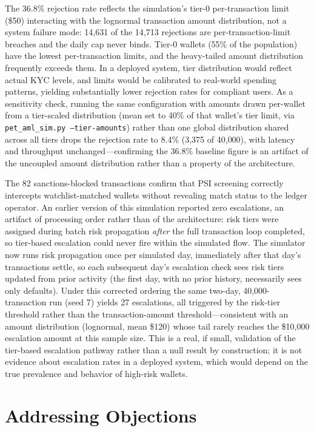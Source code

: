 \documentclass[11pt]{article}
\begin{document}
The 36.8\% rejection rate reflects the simulation's tier-0 per-transaction limit (\$50) interacting with the lognormal transaction amount distribution, not a system failure mode: 14{,}631 of the 14{,}713 rejections are per-transaction-limit breaches and the daily cap never binds. Tier-0 wallets (55\% of the population) have the lowest per-transaction limits, and the heavy-tailed amount distribution frequently exceeds them. In a deployed system, tier distribution would reflect actual KYC levels, and limits would be calibrated to real-world spending patterns, yielding substantially lower rejection rates for compliant users. As a sensitivity check, running the same configuration with amounts drawn per-wallet from a tier-scaled distribution (mean set to 40\% of that wallet's tier limit, via \texttt{pet\_aml\_sim.py --tier-amounts}) rather than one global distribution shared across all tiers drops the rejection rate to 8.4\% (3{,}375 of 40{,}000), with latency and throughput unchanged---confirming the 36.8\% baseline figure is an artifact of the uncoupled amount distribution rather than a property of the architecture.

The 82 sanctions-blocked transactions confirm that PSI screening correctly intercepts watchlist-matched wallets without revealing match status to the ledger operator. An earlier version of this simulation reported zero escalations, an artifact of processing order rather than of the architecture: risk tiers were assigned during batch risk propagation \emph{after} the full transaction loop completed, so tier-based escalation could never fire within the simulated flow. The simulator now runs risk propagation once per simulated day, immediately after that day's transactions settle, so each subsequent day's escalation check sees risk tiers updated from prior activity (the first day, with no prior history, necessarily sees only defaults). Under this corrected ordering the same two-day, 40{,}000-transaction run (seed 7) yields 27 escalations, all triggered by the risk-tier threshold rather than the transaction-amount threshold---consistent with an amount distribution (lognormal, mean \$120) whose tail rarely reaches the \$10{,}000 escalation amount at this sample size. This is a real, if small, validation of the tier-based escalation pathway rather than a null result by construction; it is not evidence about escalation rates in a deployed system, which would depend on the true prevalence and behavior of high-risk wallets.


\section{Addressing Objections}
\end{document}
